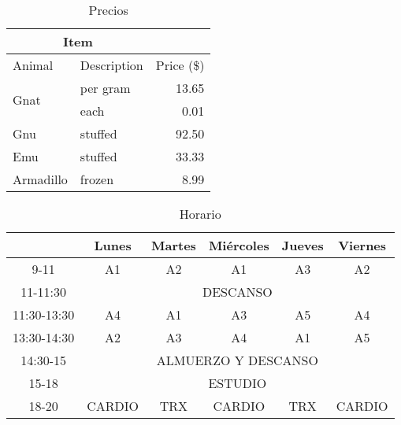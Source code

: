 \documentclass{article}
\begin{document}

\begin{table}
\caption{Precios}
\centering
\label{tab:precios}
\begin{tabular}{|l|l|r|}
\hline
\multicolumn{2}{|c|}{Item}          &            \\ \hline
Animal                & Description & Price (\$) \\ \hline
\multirow{2}{*}{Gnat} & per gram    & 13.65      \\ \cline{2-3} 
                      & each        & 0.01       \\ \hline
Gnu                   & stuffed     & 92.50      \\ \hline
Emu                   & stuffed     & 33.33      \\ \hline
Armadillo             & frozen      & 8.99       \\ \hline
\end{tabular}
\end{table}



\begin{table}
\centering
\caption{Horario}
\label{tab:horario}
\begin{tabular}{|c|c|c|c|c|c|}
\hline
            & Lunes  & Martes & Miércoles & Jueves & Viernes \\ \hline
9-11        & A1     & A2     & A1        & A3     & A2      \\ \hline
11-11:30    & \multicolumn{5}{c|}{DESCANSO}                  \\ \hline
11:30-13:30 & A4     & A1     & A3        & A5     & A4      \\ \hline
13:30-14:30 & A2     & A3     & A4        & A1     & A5      \\ \hline
14:30-15    & \multicolumn{5}{c|}{ALMUERZO Y DESCANSO}       \\ \hline
15-18       & \multicolumn{5}{c|}{ESTUDIO}                   \\ \hline
18-20       & CARDIO & TRX    & CARDIO    & TRX    & CARDIO  \\ \hline
\end{tabular}
\end{table}


\end{document}
